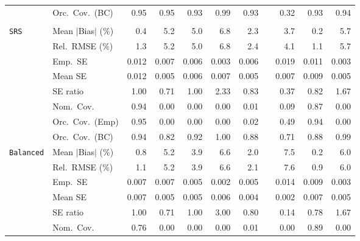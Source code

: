 \begin{landscape}
\begin{longtable}{llrrrrrrrrr}
 & Orc.\ Cov.\ (BC) & \cellcolor{rankone}0.95 & \cellcolor{rankone}0.95 & \cellcolor{rankthree}0.93 & 0.99 & \cellcolor{rankthree}0.93 &  & 0.32 & \cellcolor{rankthree}0.93 & \cellcolor{ranktwo}0.94 \\
\addlinespace[2pt]
\multicolumn{11}{l}{\textbf{Interaction}} \\
\addlinespace[2pt]
\quad \texttt{SRS} & Mean $|$Bias$|$ (\%) & \cellcolor{ranktwo}0.4 & 5.2 & 5.0 & 6.8 & \cellcolor{rankthree}2.3 &  & 3.7 & \cellcolor{rankone}0.2 & 5.7 \\
 & Rel.\ RMSE (\%) & \cellcolor{ranktwo}1.3 & 5.2 & 5.0 & 6.8 & \cellcolor{rankthree}2.4 &  & 4.1 & \cellcolor{rankone}1.1 & 5.7 \\
 & Emp.\ SE & 0.012 & 0.007 & 0.006 & 0.003 & 0.006 &  & 0.019 & 0.011 & 0.003 \\
 & Mean SE & 0.012 & 0.005 & 0.006 & 0.007 & 0.005 &  & 0.007 & 0.009 & 0.005 \\
 & SE ratio & \cellcolor{rankone}1.00 & 0.71 & \cellcolor{rankone}1.00 & 2.33 & \cellcolor{ranktwo}0.83 &  & 0.37 & \cellcolor{rankthree}0.82 & 1.67 \\
 & Nom.\ Cov. & \cellcolor{rankone}0.94 & 0.00 & 0.00 & 0.00 & 0.01 &  & \cellcolor{rankthree}0.09 & \cellcolor{ranktwo}0.87 & 0.00 \\
 & Orc.\ Cov.\ (Emp) & \cellcolor{rankone}0.95 & 0.00 & 0.00 & 0.00 & 0.02 &  & \cellcolor{rankthree}0.49 & \cellcolor{ranktwo}0.94 & 0.00 \\
 & Orc.\ Cov.\ (BC) & \cellcolor{rankone}0.94 & 0.82 & \cellcolor{ranktwo}0.92 & 1.00 & 0.88 &  & 0.71 & 0.88 & \cellcolor{rankthree}0.99 \\
\addlinespace[2pt]
\quad \texttt{Balanced} & Mean $|$Bias$|$ (\%) & \cellcolor{ranktwo}0.8 & 5.2 & 3.9 & 6.6 & \cellcolor{rankthree}2.0 &  & 7.5 & \cellcolor{rankone}0.2 & 6.0 \\
 & Rel.\ RMSE (\%) & \cellcolor{ranktwo}1.1 & 5.2 & 3.9 & 6.6 & \cellcolor{rankthree}2.1 &  & 7.6 & \cellcolor{rankone}0.9 & 6.0 \\
 & Emp.\ SE & 0.007 & 0.007 & 0.005 & 0.002 & 0.005 &  & 0.014 & 0.009 & 0.003 \\
 & Mean SE & 0.007 & 0.005 & 0.005 & 0.006 & 0.004 &  & 0.002 & 0.007 & 0.005 \\
 & SE ratio & \cellcolor{rankone}1.00 & 0.71 & \cellcolor{rankone}1.00 & 3.00 & \cellcolor{ranktwo}0.80 &  & 0.14 & \cellcolor{rankthree}0.78 & 1.67 \\
 & Nom.\ Cov. & \cellcolor{ranktwo}0.76 & 0.00 & 0.00 & 0.00 & \cellcolor{rankthree}0.01 &  & 0.00 & \cellcolor{rankone}0.89 & 0.00 \\

\end{longtable}
\end{landscape}
